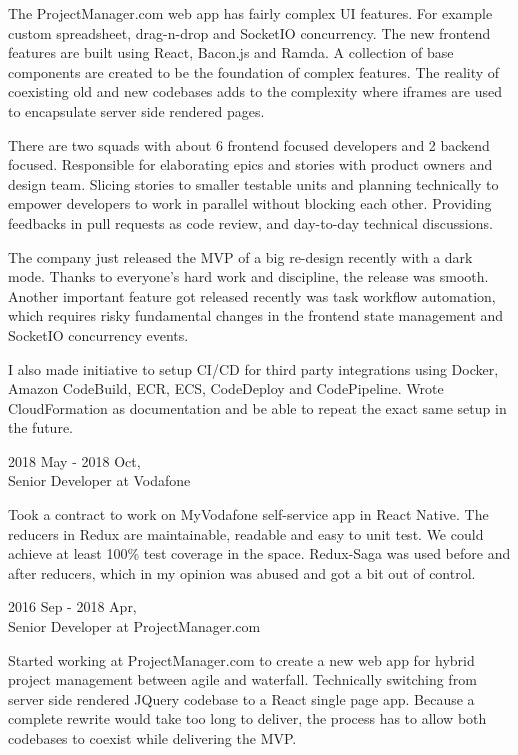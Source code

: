 \begin{resume}
The ProjectManager.com web app has fairly complex UI features. For example custom spreadsheet, drag-n-drop and SocketIO concurrency. The new frontend features are built using React, Bacon.js and Ramda. A collection of base components are created to be the foundation of complex features. The reality of coexisting old and new codebases adds to the complexity where iframes are used to encapsulate server side rendered pages.

There are two squads with about 6 frontend focused developers and 2 backend focused. Responsible for elaborating epics and stories with product owners and design team. Slicing stories to smaller testable units and planning technically to empower developers to work in parallel without blocking each other. Providing feedbacks in pull requests as code review, and day-to-day technical discussions.

The company just released the MVP of a big re-design recently with a dark mode. Thanks to everyone's hard work and discipline, the release was smooth. Another important feature got released recently was task workflow automation, which requires risky fundamental changes in the frontend state management and SocketIO concurrency events.

I also made initiative to setup CI/CD for third party integrations using Docker, Amazon CodeBuild, ECR, ECS, CodeDeploy and CodePipeline. Wrote CloudFormation as documentation and be able to repeat the exact same setup in the future.

\newpage
\hspace*{-0.25in} 2018 May - 2018 Oct,\\
\hspace*{-0.25in} Senior Developer at Vodafone

Took a contract to work on MyVodafone self-service app in React Native. The reducers in Redux are maintainable, readable and easy to unit test. We could achieve at least 100\% test coverage in the space. Redux-Saga was used before and after reducers, which in my opinion was abused and got a bit out of control.

\hspace*{-0.25in} 2016 Sep - 2018 Apr,\\
\hspace*{-0.25in} Senior Developer at ProjectManager.com

Started working at ProjectManager.com to create a new web app for hybrid project management between agile and waterfall. Technically switching from server side rendered JQuery codebase to a React single page app. Because a complete rewrite would take too long to deliver, the process has to allow both codebases to coexist while delivering the MVP.


\end{resume}
